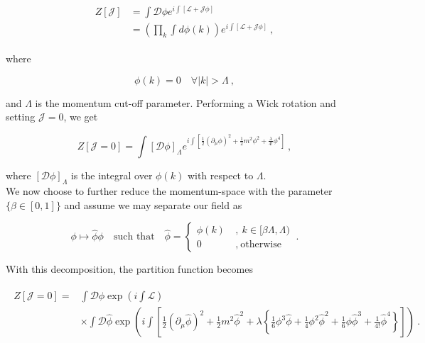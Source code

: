 \documentclass[10pt,twoside]{report}
\begin{document}
	\begin{align}
		\begin{split}
		Z[\mathcal{J}] &= \int\mathcal{D}\phi e^{i\int\left[\mathcal{L} + \mathcal{J}\phi\right]} \\
		&= \left( \prod_k\int d\phi(k) \right)e^{i\int\left[\mathcal{L} + \mathcal{J}\phi\right]} \:,
		\end{split}
	\end{align}
	
	\noindent where
	
	\begin{equation}
		\phi(k) = 0 \quad\forall |k|>\Lambda \:,
	\end{equation}
	
	\noindent and $\Lambda$ is the momentum cut-off parameter. Performing a Wick rotation and setting $\mathcal{J} = 0$, we get
	
	\begin{equation}
		Z[\mathcal{J}=0] = \int\left[\mathcal{D}\phi\right]_\Lambda e^{i\int\left[ \frac{1}{2}\left(\partial_\mu\phi\right)^2 + \frac{1}{2}m^2\phi^2 + \frac{\lambda}{4!}\phi^4\right]} \:,
	\end{equation}
	
	\noindent where $\left[\mathcal{D}\phi\right]_\Lambda$ is the integral over $\phi(k)$ with respect to $\Lambda$.\\
	
	We now choose to further reduce the momentum-space with the parameter $\{\beta\in[0,1]\}$ and assume we may separate our field as
	
	\begin{equation}
		\phi \mapsto \hat{\phi}\phi \quad\text{such that}\quad \hat{\phi} =  \begin{cases}
		 \phi(k) \: &,\:k\in[\beta\Lambda,\Lambda) \\
		 0 \: &,\:\text{otherwise}
		\end{cases}\:.
	\end{equation}
	
	With this decomposition, the partition function becomes
	
	\begin{align}
		\begin{split}
			Z[\mathcal{J}=0] = &\int\mathcal{D}\phi \exp\left(i\int\mathcal{L}\right) \\
			&\times\int\mathcal{D}\hat{\phi} \exp\left(i\int\left[ \frac{1}{2}\left(\partial_\mu\hat{\phi}\right)^2 + \frac{1}{2}m^2\hat{\phi}^2 + \lambda\left\{ \frac{1}{6}\phi^3\hat{\phi} + \frac{1}{4}\phi^2\hat{\phi}^2 + \frac{1}{6}\phi\hat{\phi}^3 + \frac{1}{4!}\hat{\phi}^4 \right\}\right]\right) \:.
		\end{split}
	\end{align}
	
\end{document}
